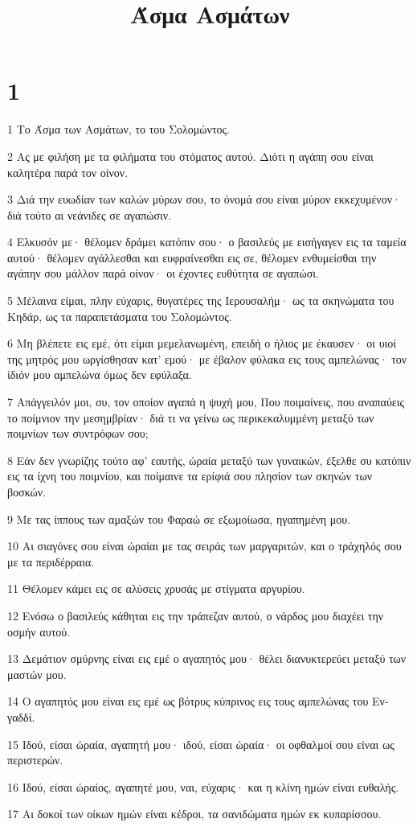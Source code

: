 

\title{Άσμα Ασμάτων}


\chapter{1}

\par 1 Το Άσμα των Ασμάτων, το του Σολομώντος.
\par 2 Ας με φιλήση με τα φιλήματα του στόματος αυτού. Διότι η αγάπη σου είναι καλητέρα παρά τον οίνον.
\par 3 Διά την ευωδίαν των καλών μύρων σου, το όνομά σου είναι μύρον εκκεχυμένον· διά τούτο αι νεάνιδες σε αγαπώσιν.
\par 4 Ελκυσόν με· θέλομεν δράμει κατόπιν σου· ο βασιλεύς με εισήγαγεν εις τα ταμεία αυτού· θέλομεν αγάλλεσθαι και ευφραίνεσθαι εις σε, θέλομεν ενθυμείσθαι την αγάπην σου μάλλον παρά οίνον· οι έχοντες ευθύτητα σε αγαπώσι.
\par 5 Μέλαινα είμαι, πλην εύχαρις, θυγατέρες της Ιερουσαλήμ· ως τα σκηνώματα του Κηδάρ, ως τα παραπετάσματα του Σολομώντος.
\par 6 Μη βλέπετε εις εμέ, ότι είμαι μεμελανωμένη, επειδή ο ήλιος με έκαυσεν· οι υιοί της μητρός μου ωργίσθησαν κατ' εμού· με έβαλον φύλακα εις τους αμπελώνας· τον ίδιόν μου αμπελώνα όμως δεν εφύλαξα.
\par 7 Απάγγειλόν μοι, συ, τον οποίον αγαπά η ψυχή μου, Που ποιμαίνεις, που αναπαύεις το ποίμνιον την μεσημβρίαν· διά τι να γείνω ως περικεκαλυμμένη μεταξύ των ποιμνίων των συντρόφων σου;
\par 8 Εάν δεν γνωρίζης τούτο αφ' εαυτής, ώραία μεταξύ των γυναικών, έξελθε συ κατόπιν εις τα ίχνη του ποιμνίου, και ποίμαινε τα ερίφιά σου πλησίον των σκηνών των βοσκών.
\par 9 Με τας ίππους των αμαξών του Φαραώ σε εξωμοίωσα, ηγαπημένη μου.
\par 10 Αι σιαγόνες σου είναι ώραίαι με τας σειράς των μαργαριτών, και ο τράχηλός σου με τα περιδέρραια.
\par 11 Θέλομεν κάμει εις σε αλύσεις χρυσάς με στίγματα αργυρίου.
\par 12 Ενόσω ο βασιλεύς κάθηται εις την τράπεζαν αυτού, ο νάρδος μου διαχέει την οσμήν αυτού.
\par 13 Δεμάτιον σμύρνης είναι εις εμέ ο αγαπητός μου· θέλει διανυκτερεύει μεταξύ των μαστών μου.
\par 14 Ο αγαπητός μου είναι εις εμέ ως βότρυς κύπρινος εις τους αμπελώνας του Εν-γαδδί.
\par 15 Ιδού, είσαι ώραία, αγαπητή μου· ιδού, είσαι ώραία· οι οφθαλμοί σου είναι ως περιστερών.
\par 16 Ιδού, είσαι ώραίος, αγαπητέ μου, ναι, εύχαρις· και η κλίνη ημών είναι ευθαλής.
\par 17 Αι δοκοί των οίκων ημών είναι κέδροι, τα σανιδώματα ημών εκ κυπαρίσσου.


